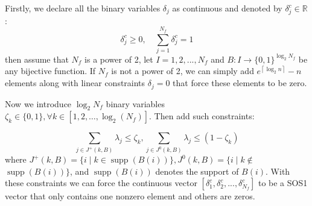 \documentclass[a4paper]{report}
\begin{document}
Firstly, we declare all the binary variables $\delta_j$ as continuous and denoted by $\delta_j^c \in \mathbb{R}$:
\begin{equation}
    \delta_j^c \geq 0, \quad \sum_{j=1}^{N_f} \delta_{j}^c=1
\end{equation}
then assume that $N_f$ is a power of 2, let $ I=1,2,...,N_f $ and $B:I \rightarrow \{0, 1\}^{\log_2N_f}$ be any bijective function. If $N_f$ is not a power of 2, we can simply add $e^{\left\lceil\log _2 n\right\rceil}-n$ elements along with linear constraints $\delta_j=0$ that force these elements to be zero.

Now we introduce $\log_2N_f$ binary variables $\zeta_k \in\{0,1\}, \forall k \in\left[1,2, \ldots, \log _2(N_f)\right]$. Then add such constraints:

\begin{equation}
    \sum_{j \in J^{+}(k, B)} \lambda_j \leq \zeta_k, \sum_{j \in J^0(k, B)} \lambda_j \leq\left(1-\zeta_k\right)
\end{equation}
where $J^{+}(k, B)=\{i \mid k \in \operatorname{supp}(B(i))\}, J^0(k, B)=\{i \mid k \notin$ $\operatorname{supp}(B(i))\}$, and $\operatorname{supp}(B(i))$ denotes the support of $B(i)$.
With these constraints we can force the continuous vector $[\delta_1^c,\delta_2^c,...,\delta_{N_f}^c]$
to be a SOS1 vector that only contains one nonzero element and others are zeros.
\end{document}
